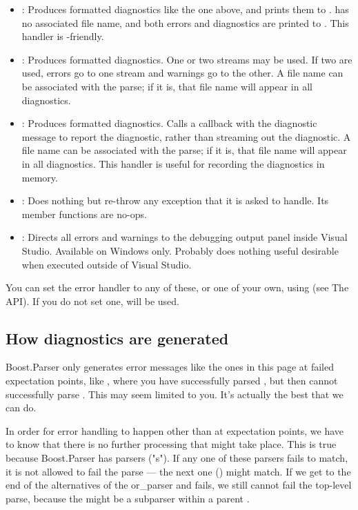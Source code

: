 \documentclass{MyBook}
\begin{document}
\begin{itemize}
\item
  : Produces formatted diagnostics like the one above, and prints them to .  has no associated file name, and both errors and diagnostics are printed to . This handler is -friendly.
\item
  : Produces formatted diagnostics. One or two streams may be used. If two are used, errors go to one stream and warnings go to the other. A file name can be associated with the parse; if it is, that file name will appear in all diagnostics.
\item
  : Produces formatted diagnostics. Calls a callback with the diagnostic message to report the diagnostic, rather than streaming out the diagnostic. A file name can be associated with the parse; if it is, that file name will appear in all diagnostics. This handler is useful for recording the diagnostics in memory.
\item
  : Does nothing but re-throw any exception that it is asked to handle. Its  member functions are no-ops.
\item
  : Directs all errors and warnings to the debugging output panel inside Visual Studio. Available on Windows only. Probably does nothing useful desirable when executed outside of Visual Studio.
\end{itemize}

You can set the error handler to any of these, or one of your own, using  (see The  API). If you do not set one,  will be used.

\subsection{How diagnostics are generated}

Boost.Parser only generates error messages like the ones in this page at failed expectation points, like , where you have successfully parsed , but then cannot successfully parse . This may seem limited to you. It's actually the best that we can do.

In order for error handling to happen other than at expectation points, we have to know that there is no further processing that might take place. This is true because Boost.Parser has  parsers ("s"). If any one of these parsers  fails to match, it is not allowed to fail the parse --- the next one () might match. If we get to the end of the alternatives of the or\_parser and  fails, we still cannot fail the top-level parse, because the  might be a subparser within a parent .
\end{document}
